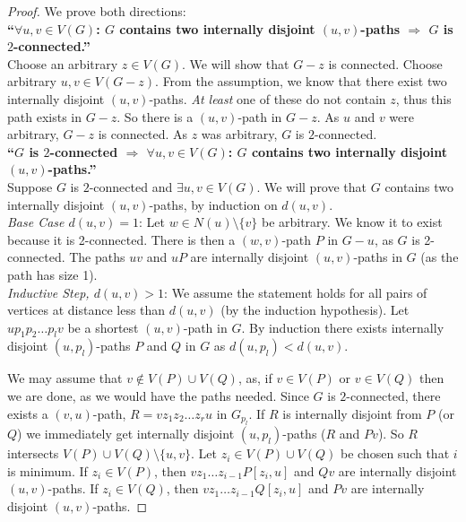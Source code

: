\begin{proof}
	We prove both directions: \\
	\noindent
	\textbf{``\(\forall u,v \in V(G)\): $G$ contains two internally disjoint $(u,v)$-paths \(\Rightarrow\) $G$ is $2$-connected.''}\\
	\noindent
	Choose an arbitrary $z \in V(G)$. We will show that $G - z$ is connected. Choose arbitrary $u, v \in V(G-z)$. From the assumption, we know that there exist two internally disjoint $(u,v)$-paths. \textit{At least} one of these do not contain $z$, thus this path exists in $G-z$. So there is a $(u,v)$-path in $G-z$. As $u$ and $v$ were arbitrary, $G-z$ is connected. As $z$ was arbitrary, $G$ is $2$-connected.\\
	\noindent
	\textbf{``$G$ is $2$-connected \(\Rightarrow\) \(\forall u,v \in V(G)\): $G$ contains two internally disjoint $(u,v)$-paths.''}\\
	\noindent
	Suppose $G$ is $2$-connected and $\exists u,v \in V(G)$. We will prove that $G$ contains two internally disjoint $(u,v)$-paths, by induction on $d(u,v)$.\\
	\noindent
	\textit{Base Case $d(u,v) = 1$}: Let $w \in N(u) \setminus \{v\}$ be arbitrary. We know it to exist because it is 2-connected. There is then a $(w,v)$-path $P$	in $G-u$, as $G$ is 2-connected. The paths $uv$ and $uP$ are internally disjoint $(u,v)$-paths in $G$ (as the path has size 1).\\
	\noindent
	\textit{Inductive Step, $d(u,v) > 1$}: We assume the statement holds for all pairs of vertices at distance less than $d(u,v)$ (by the induction hypothesis). Let $up_{1}p_{2} \ldots p_{l}v$ be a shortest $(u,v)$-path in $G$. By induction there exists internally disjoint $(u, p_{l})$-paths $P$ and $Q$ in $G$ as $d(u,p_{l}) < d(u,v)$.

	We may assume that $v \notin V(P) \cup V(Q)$, as, if $v \in V(P)$ or $v \in V(Q)$ then we are done, as we would have the paths needed. Since $G$ is $2$-connected, there exists a $(v,u)$-path, $R = vz_{1}z_{2} \ldots z_{r}u$ in $G_{p_{l}}$. If $R$ is internally disjoint from $P$ (or $Q$) we immediately get internally disjoint $(u,p_{l})$-paths ($R$ and $Pv$). So $R$ intersects $V(P) \cup V(Q) \setminus \{u,v\}$. Let $z_{i} \in V(P) \cup V(Q)$ be chosen such that $i$ is minimum. If $z_{i} \in V(P)$, then $vz_{1}\ldots z_{i-1}P[z_{i},u]$ and $Qv$ are internally disjoint $(u,v)$-paths. If $z_{i} \in V(Q)$, then $vz_{1}\ldots z_{i-1}Q[z_{i},u]$ and $Pv$ are internally disjoint $(u,v)$-paths.
\end{proof}

